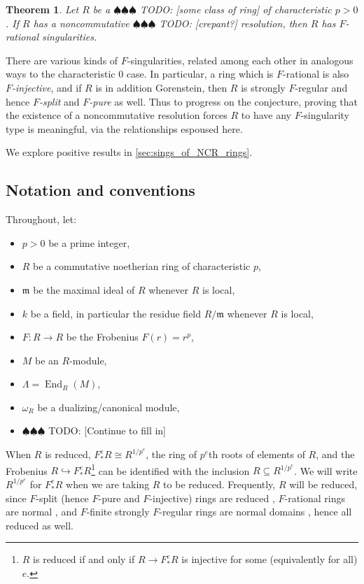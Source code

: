 \documentclass{amsart}
\newtheorem{thm}{Theorem}[section]
\theoremstyle{definition}
\def\fm{\mathfrak{m}}
\DeclareMathOperator{\End}{\operatorname{End}}
\newcommand{\Fe}{F_{*}^{e}}
\newcommand{\Rpe}{R^{1/p^{e}}}
\newcommand{\todo}[1]{{\color{teal} \sf $\spadesuit\spadesuit\spadesuit$ TODO: [#1]}}
\begin{document}
\bigbreak

\begin{thm}
Let $R$ be a \todo{some class of ring} of characteristic $p>0$. If $R$ has a noncommutative \todo{crepant?} resolution, then $R$ has $F$-rational singularities.
\end{thm}

\bigbreak

There are various kinds of $F$-singularities, related among each other in analogous ways to the characteristic $0$ case. In particular, a ring which is $F$-rational is also \emph{$F$-injective}, and if $R$ is in addition Gorenstein, then $R$ is strongly $F$-regular and hence \emph{$F$-split} and \emph{$F$-pure} as well. Thus to progress on the conjecture, proving that the existence of a noncommutative resolution forces $R$ to have any $F$-singularity type is meaningful, via the relationships espoused here.

\bigbreak

We explore positive results in \cref{sec:sings_of_NCR_rings}.

\bigbreak

\subsection{Notation and conventions}\label{subsec:notation}

Throughout, let:
\begin{itemize}
\item $p>0$ be a prime integer,
\item $R$ be a commutative noetherian ring of characteristic $p$,
\item $\fm$ be the maximal ideal of $R$ whenever $R$ is local,
\item $k$ be a field, in particular the residue field $R/\fm$ whenever $R$ is local,
\item $F\colon R\to R$ be the Frobenius $F(r)=r^{p}$,
\item $M$ be an $R$-module,
\item $\Lambda=\End_{R}(M)$,
\item $\omega_{R}$ be a dualizing/canonical module,
\item \todo{Continue to fill in}
\end{itemize}

\bigbreak

When $R$ is reduced, $\Fe R\cong\Rpe$, the ring of $p^{e}$th roots of elements of $R$, and the Frobenius $R\hookrightarrow\Fe R$\footnote{$R$ is reduced if and only if $R\to \Fe R$ is injective for some (equivalently for all) $e$.} can be identified with the inclusion $R\subseteq\Rpe$. We will write $\Rpe$ for $\Fe R$ when we are taking $R$ to be reduced. Frequently, $R$ will be reduced, since $F$-split (hence $F$-pure and $F$-injective) rings are reduced \cite[\S2]{MP21}, $F$-rational rings are normal \cite[Prop.\ ~4.4]{MP21}, and $F$-finite strongly $F$-regular rings are normal domains \cite[Lem.\ ~3.2, Cor.\ ~3.8]{MP21}, hence all reduced as well.
\end{document}

